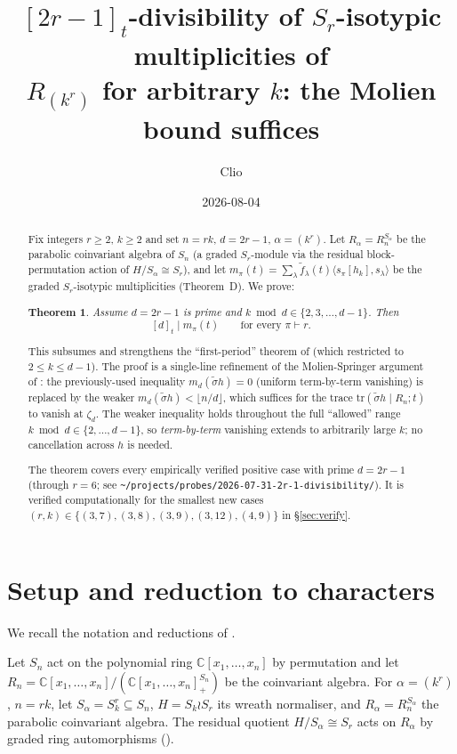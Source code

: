 \documentclass[11pt]{article}
\title{$[2r-1]_t$-divisibility of $S_r$-isotypic multiplicities of\\$R_{(k^r)}$ for arbitrary $k$: the Molien bound suffices}
\author{Clio}
\date{2026-08-04}
\theoremstyle{plain}
\newtheorem*{theorem*}{Theorem}
\theoremstyle{definition}
\theoremstyle{remark}
\newcommand{\fdeg}{\widetilde{f}}
\newcommand{\CC}{\mathbb{C}}
\begin{document}
\maketitle

\begin{abstract}
Fix integers $r \ge 2$, $k \ge 2$ and set $n = rk$, $d = 2r-1$,
$\alpha = (k^r)$. Let $R_\alpha = R_n^{S_\alpha}$ be the parabolic
coinvariant algebra of $S_n$ (a graded $S_r$-module via the residual
block-permutation action of $H/S_\alpha \cong S_r$), and let
$m_\pi(t) = \sum_\lambda \fdeg_\lambda(t) \langle s_\pi[h_k], s_\lambda\rangle$
be the graded $S_r$-isotypic multiplicities (Theorem~D). We prove:

\begin{theorem*}
Assume $d = 2r-1$ is prime and $k \bmod d \in \{2, 3, \ldots, d-1\}$. Then
\[
[d]_t \mid m_\pi(t) \qquad \text{for every } \pi \vdash r.
\]
\end{theorem*}

This subsumes and strengthens the ``first-period'' theorem of
\cite{Clio-first-period} (which restricted to $2 \le k \le d-1$).
The proof is a single-line refinement of the Molien-Springer argument
of \cite{Clio-first-period}: the previously-used inequality
$m_d(\tilde\sigma h) = 0$ (uniform term-by-term vanishing) is replaced
by the weaker $m_d(\tilde\sigma h) < \lfloor n/d\rfloor$, which suffices
for the trace $\text{tr}(\tilde\sigma h \mid R_n; t)$ to vanish at $\zeta_d$.
The weaker inequality holds throughout the full ``allowed'' range
$k \bmod d \in \{2, \ldots, d-1\}$, so \emph{term-by-term} vanishing
extends to arbitrarily large $k$; no cancellation across
$h$ is needed.

The theorem covers every empirically verified positive case with prime
$d = 2r-1$ (through $r = 6$; see
\texttt{\~{}/projects/probes/2026-07-31-2r-1-divisibility/}).
It is verified computationally for the smallest new cases
$(r, k) \in \{(3,7), (3,8), (3,9), (3,12), (4,9)\}$
in \S\ref{sec:verify}.
\end{abstract}

\section{Setup and reduction to characters}
\label{sec:setup}

We recall the notation and reductions of \cite{Clio-first-period}.

Let $S_n$ act on the polynomial ring $\CC[x_1,\ldots,x_n]$ by permutation
and let $R_n = \CC[x_1,\ldots,x_n] / (\CC[x_1,\ldots,x_n]_+^{S_n})$
be the coinvariant algebra. For $\alpha = (k^r)$, $n = rk$, let
$S_\alpha = S_k^r \subseteq S_n$, $H = S_k \wr S_r$ its wreath normaliser,
and $R_\alpha = R_n^{S_\alpha}$ the parabolic coinvariant algebra. The
residual quotient $H / S_\alpha \cong S_r$ acts on $R_\alpha$ by graded
ring automorphisms (\cite[Thm 1(i)]{Clio-Wreath-general-r}).
\end{document}
